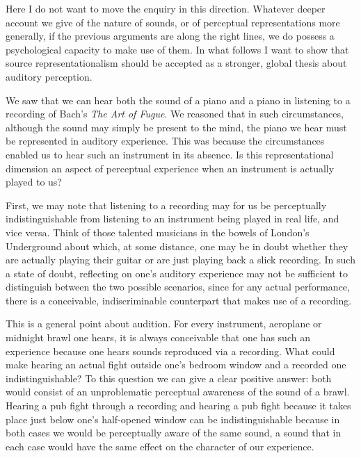 \documentclass[sloppy, journal, git, bytitle, dodraft]{humapap}
\begin{document}
Here I do not want to move the enquiry in this direction. Whatever deeper account we give of the nature of sounds, or of perceptual representations more generally, if the previous arguments are along the right lines, we do possess a psychological capacity to make use of them. In what follows I want to show that source representationalism should be accepted as a stronger, global thesis about auditory perception.


\sect We saw that we can hear both the sound of a piano and a piano in listening to a recording of Bach's \emph{The Art of Fugue}. We reasoned that in such circumstances, although the sound may simply be present to the mind, the piano we hear must be represented in auditory experience. This was because the circumstances enabled us to hear such an instrument in its absence. Is this representational dimension an aspect of perceptual experience when an instrument is actually played to us? 

First, we may note that listening to a recording may for us be perceptually indistinguishable from listening to an instrument being played in real life, and vice versa. Think of those talented musicians in the bowels of London's Underground about which, at some distance, one may be in doubt whether they are actually playing their guitar or are just playing back a slick recording. In such a state of doubt, reflecting on one's auditory experience may not be sufficient to distinguish between the two possible scenarios, since for any actual performance, there is a conceivable, indiscriminable counterpart that makes use of a recording. 

This is a general point about audition. For every instrument, aeroplane or midnight brawl one hears, it is always conceivable that one has such an experience because one hears sounds reproduced via a recording. What could make hearing an actual fight outside one's bedroom window and a recorded one indistinguishable? To this question we can give a clear positive answer: both would consist of an unproblematic perceptual awareness of the sound of a brawl. Hearing a pub fight through a recording and hearing a pub fight because it takes place just below one's half-opened window can be indistinguishable because in both cases we would be perceptually aware of the same sound, a sound that in each case would have the same effect on the character of our experience.
\end{document}
